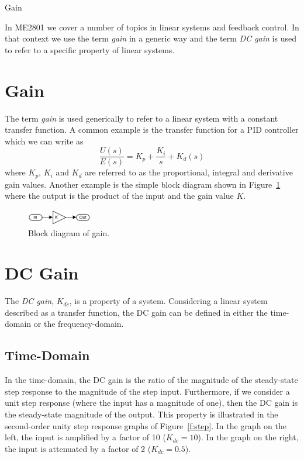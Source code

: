 \documentclass[11pt]{article}
\begin{document}
\begin{center}
  \Huge{Gain}
\end{center}

In ME2801 we cover a number of topics in linear systems and feedback control.  In that context we use the term \emph{gain} in a generic way and the term \emph{DC gain} is used to refer to a specific property of linear systems.

\section{Gain}

The term \emph{gain} is used generically to refer to a linear system with a constant transfer function.  A common example is the transfer function for a PID controller which we can write as
\[
\frac{U(s)}{E(s)} = K_p + \frac{K_i}{s} + K_d (s)
  \]
  where $K_p$, $K_i$ and $K_d$ are referred to as the proportional, integral and derivative gain values.  Another example is the simple block diagram shown in Figure~\ref{f:gainblock} where the output is the product of the input and the gain value $K$.

\begin{figure}[htb!]
\centering  
\includegraphics [width=0.25\textwidth]{gain_block.png}
\caption{Block diagram of gain.}
\label{f:gainblock}
\end{figure}

  
\section{DC Gain}

The \emph{DC gain}, $K_{dc}$, is a property of a system.  Considering a linear system described as a transfer function, the DC gain can be defined in either the time-domain or the frequency-domain.

\subsection{Time-Domain}
In the time-domain, the DC gain is the ratio of the magnitude of the steady-state step response to the magnitude of the step input.  Furthermore, if we consider a unit step response (where the input has a magnitude of one), then the DC gain is the steady-state magnitude of the output.  This property is illustrated in the second-order unity step response graphs of Figure~\ref{f:step}.  In the graph on the left, the input is amplified by a factor of 10 ($K_{dc}=10$).  In the graph on the right, the input is attenuated by a factor of 2 ($K_{dc}=0.5$).
\end{document}
